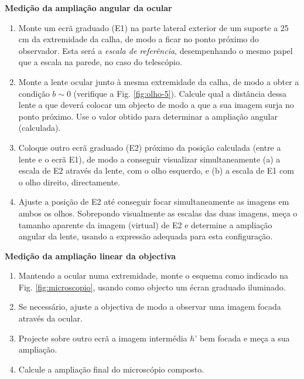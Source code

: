 \documentclass[a4paper,12pt]{article}      %
\begin{document}
\textbf{Medição da ampliação angular da ocular}
\begin{enumerate}
\item Monte um ecrã graduado (E1) na parte lateral exterior de um suporte a 25 cm da extremidade da calha, de modo a ficar no ponto próximo do observador. Esta será a \emph{escala de referência}, desempenhando o mesmo papel que a escala na parede, no caso do telescópio.
\item Monte a lente ocular junto à mesma extremidade da calha, de modo a obter a condição $b\sim 0$ (verifique a Fig. \ref{fig:olho-5}). Calcule qual a distância dessa lente a que deverá colocar um objecto de modo a que a sua imagem surja no ponto próximo. Use o valor obtido para determinar a ampliação angular (calculada).
\item Coloque outro ecrã graduado (E2) próximo da posição calculada (entre a lente e o ecrã E1), de modo a conseguir visualizar simultaneamente (a) a escala de E2 através da lente, com o olho esquerdo, e (b) a escala de E1 com o olho direito, directamente. 
\item Ajuste a posição de E2 até conseguir focar simultaneamente as imagens em ambos os olhos. Sobrepondo visualmente as escalas das duas imagens, meça o tamanho aparente da imagem (virtual) de E2 e determine a ampliação angular da lente, usando a expressão adequada para esta configuração.
\end{enumerate}

\textbf{Medição da ampliação linear da objectiva}
\begin{enumerate}[resume]
\item Mantendo a ocular numa extremidade, monte o esquema como indicado na Fig. \ref{fig:microscopio}, usando como objecto um écran graduado iluminado.
\item Se necessário, ajuste a objectiva de modo a observar uma imagem focada através da ocular.
\item Projecte sobre outro ecrã a imagem intermédia  $h’$ bem focada e meça a sua ampliação.
\item Calcule a ampliação final do microscópio composto.
\end{enumerate}
\end{document}
